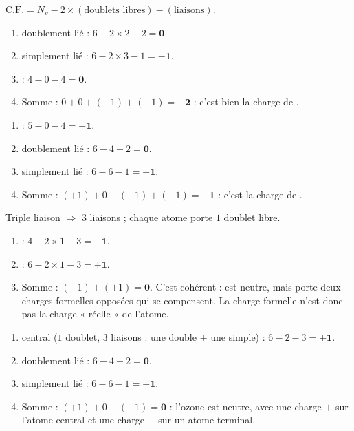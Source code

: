 \documentclass[11pt,a4paper]{article}
\begin{document}
\newcommand{\CF}{\ensuremath{\mathrm{C.F.}}}
\begin{corrige}
$\CF = N_v - 2\times(\text{doublets libres}) - (\text{liaisons})$.
\begin{enumerate}[label=\alph*)]
  \item {} doublement lié : $6 - 2\times 2 - 2 = \mathbf{0}$.
  \item {} simplement lié : $6 - 2\times 3 - 1 = \mathbf{-1}$.
  \item {} : $4 - 0 - 4 = \mathbf{0}$.
  \item Somme : $0 + 0 + (-1) + (-1) = \mathbf{-2}$ : c'est bien la charge de . \checkmark
\end{enumerate}
\end{corrige}

\begin{corrige}
\begin{enumerate}[label=\alph*)]
  \item {} : $5 - 0 - 4 = \mathbf{+1}$.
  \item {} doublement lié : $6 - 4 - 2 = \mathbf{0}$.
  \item {} simplement lié : $6 - 6 - 1 = \mathbf{-1}$.
  \item Somme : $(+1) + 0 + (-1) + (-1) = \mathbf{-1}$ : c'est la charge de . \checkmark
\end{enumerate}
\end{corrige}

\begin{corrige}
Triple liaison $\Rightarrow$ $3$ liaisons ; chaque atome porte $1$ doublet libre.
\begin{enumerate}[label=\alph*)]
  \item {} : $4 - 2\times 1 - 3 = \mathbf{-1}$.
  \item {} : $6 - 2\times 1 - 3 = \mathbf{+1}$.
  \item Somme : $(-1) + (+1) = \mathbf{0}$. C'est cohérent :  est neutre, mais porte deux
        charges formelles opposées qui se compensent. La charge formelle n'est donc pas la charge
        « réelle » de l'atome.
\end{enumerate}
\end{corrige}

\begin{corrige}[l'ozone \ce{O3}]
\begin{enumerate}[label=\alph*)]
  \item {} central ($1$ doublet, $3$ liaisons : une double $+$ une simple) :
        $6 - 2 - 3 = \mathbf{+1}$.
  \item {} doublement lié : $6 - 4 - 2 = \mathbf{0}$.
  \item {} simplement lié : $6 - 6 - 1 = \mathbf{-1}$.
  \item Somme : $(+1) + 0 + (-1) = \mathbf{0}$ : l'ozone est neutre, avec une charge $+$ sur
        l'atome central et une charge $-$ sur un atome terminal.
\end{enumerate}
\end{corrige}
\end{document}
